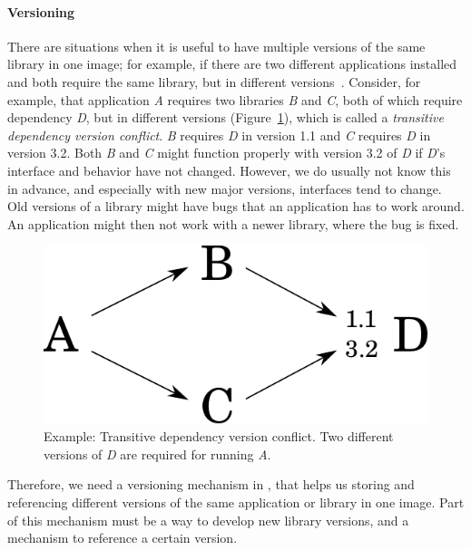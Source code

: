 \paragraph{Versioning}

There are situations when it is useful to have multiple versions of the same library in one image; for example, if there are two different applications installed and both require the same library, but in different versions~\cite{springerniephaus}. Consider, for example, that application \emph{A} requires two libraries \emph{B} and \emph{C}, both of which require dependency \emph{D}, but in different versions (Figure~\ref{fig:concept_problem}), which is called a \emph{transitive dependency version conflict}. \emph{B} requires \emph{D} in version 1.1 and \emph{C} requires \emph{D} in version 3.2. Both \emph{B} and \emph{C} might function properly with version 3.2 of \emph{D} if \emph{D}'s interface and behavior have not changed. However, we do usually not know this in advance, and especially with new major versions, interfaces tend to change. Old versions of a library might have bugs that an application has to work around. An application might then not work with a newer library, where the bug is fixed.

\begin{figure}
	\includegraphics[scale=0.65]{concept_problem.pdf}
	\centering
	\caption[Example: Transitive dependency version conflict]{Example: Transitive dependency version conflict. Two different versions of \emph{D} are required for running \emph{A}.}
	\label{fig:concept_problem}
\end{figure}

Therefore, we need a versioning mechanism in \msname, that helps us storing and referencing different versions of the same application or library in one image. Part of this mechanism must be a way to develop new library versions, and a mechanism to reference a certain version.

